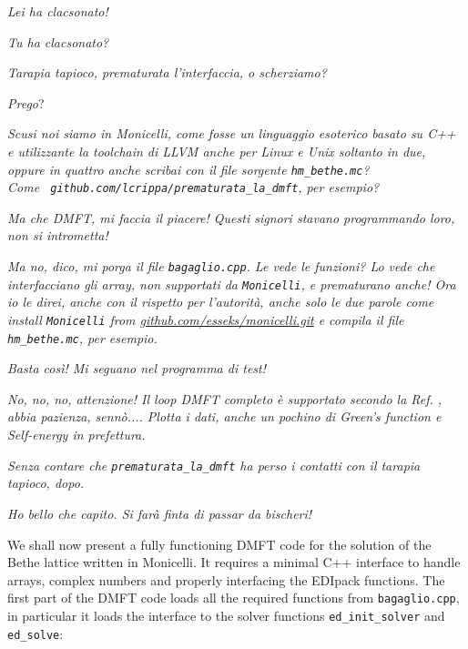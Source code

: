 \documentclass[edipack_sp.tex]{subfiles}
\begin{document}
\begin{dialogue}
 {\it Lei ha clacsonato!}

 {\it Tu ha clacsonato?}
\par\lips\par

 {\it Tarapia tapioco, prematurata l'interfaccia, o scherziamo?}

 {\it Prego}?

 {\it Scusi noi siamo in Monicelli, come fosse un linguaggio esoterico basato su C++ e utilizzante la toolchain di LLVM anche per Linux e Unix soltanto in due, oppure in quattro anche scribai con il file
sorgente {\tt hm\_bethe.mc}? \\ Come {\tt
  github.com/lcrippa/prematurata\_la\_dmft}, per esempio?}

 {\it Ma che DMFT, mi faccia il piacere! Questi signori stavano programmando loro, non si intrometta!}

 {\it Ma no, dico, mi porga il file {\tt bagaglio.cpp}. Le vede le funzioni? Lo vede che interfacciano gli array, non supportati da {\tt Monicelli}, e prematurano anche! 
Ora io le direi, anche con il rispetto per l'autorità, anche solo le
due parole come install {\tt Monicelli} from
\href{https://github.com/esseks/monicelli.git}{github.com/esseks/monicelli.git}
e compila il file {\tt hm\_bethe.mc}, per esempio.}

 {\it Basta così! Mi seguano nel programma di test!}

 {\it No, no, no, attenzione! Il loop DMFT completo \`e supportato secondo la Ref. \cite{Georges1996RMP}, abbia pazienza,
senn\`o.... Plotta i dati, anche un pochino di Green's function e
Self-energy in prefettura.}

 {\it Senza contare che {\tt prematurata\_la\_dmft} ha perso i contatti con il tarapia tapioco, dopo.}

\par\lips\par

 {\it Ho bello che capito. Si farà finta di passar da bischeri!}
\end{dialogue}

We shall now present a fully functioning DMFT code for
the solution of the Bethe lattice written in Monicelli. It requires a minimal C++
interface to handle arrays, complex numbers and properly interfacing
the EDIpack functions.
The first part of the DMFT code loads all the required functions from
{\tt bagaglio.cpp}, in particular it loads the interface to the \NAME
solver functions {\tt ed\_init\_solver} and {\tt ed\_solve}:
\end{document}
